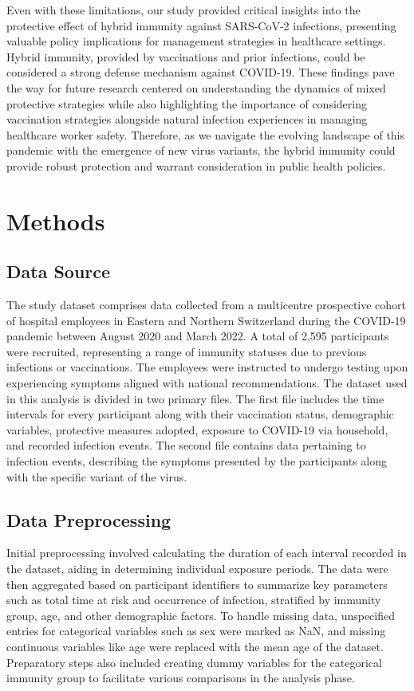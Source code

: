 \documentclass[11pt]{article}
\begin{document}
Even with these limitations, our study provided critical insights into the protective effect of hybrid immunity against SARS-CoV-2 infections, presenting valuable policy implications for management strategies in healthcare settings. Hybrid immunity, provided by vaccinations and prior infections, could be considered a strong defense mechanism against COVID-19. These findings pave the way for future research centered on understanding the dynamics of mixed protective strategies while also highlighting the importance of considering vaccination strategies alongside natural infection experiences in managing healthcare worker safety. Therefore, as we navigate the evolving landscape of this pandemic with the emergence of new virus variants, the hybrid immunity could provide robust protection and warrant consideration in public health policies.

\section*{Methods}

\subsection*{Data Source}
The study dataset comprises data collected from a multicentre prospective cohort of hospital employees in Eastern and Northern Switzerland during the COVID-19 pandemic between August 2020 and March 2022. A total of 2,595 participants were recruited, representing a range of immunity statuses due to previous infections or vaccinations. The employees were instructed to undergo testing upon experiencing symptoms aligned with national recommendations. The dataset used in this analysis is divided in two primary files. The first file includes the time intervals for every participant along with their vaccination status, demographic variables, protective measures adopted, exposure to COVID-19 via household, and recorded infection events. The second file contains data pertaining to infection events, describing the symptoms presented by the participants along with the specific variant of the virus.

\subsection*{Data Preprocessing}
Initial preprocessing involved calculating the duration of each interval recorded in the dataset, aiding in determining individual exposure periods. The data were then aggregated based on participant identifiers to summarize key parameters such as total time at risk and occurrence of infection, stratified by immunity group, age, and other demographic factors. To handle missing data, unspecified entries for categorical variables such as sex were marked as NaN, and missing continuous variables like age were replaced with the mean age of the dataset. Preparatory steps also included creating dummy variables for the categorical immunity group to facilitate various comparisons in the analysis phase.
\end{document}
